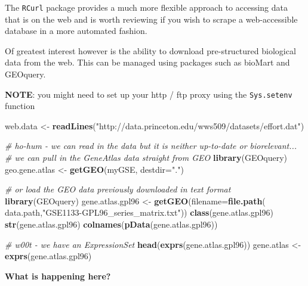 \documentclass[a4paper]{book}
\newenvironment{Shaded}{\begin{snugshade}}{\end{snugshade}}
\newcommand{\KeywordTok}[1]{\textcolor[rgb]{0.13,0.29,0.53}{\textbf{{#1}}}}
\newcommand{\DataTypeTok}[1]{\textcolor[rgb]{0.13,0.29,0.53}{{#1}}}
\newcommand{\StringTok}[1]{\textcolor[rgb]{0.31,0.60,0.02}{{#1}}}
\newcommand{\CommentTok}[1]{\textcolor[rgb]{0.56,0.35,0.01}{\textit{{#1}}}}
\newcommand{\NormalTok}[1]{{#1}}
\renewenvironment{Shaded}
{\vspace{1.5em}\begin{leftbar}\begin{snugshade}}
{\end{snugshade}\end{leftbar}\vspace{3pt}}
\begin{document}
The \texttt{RCurl} package provides a much more flexible approach to
accessing data that is on the web and is worth reviewing if you wish to
scrape a web-accessible database in a more automated fashion.

Of greatest interest however is the ability to download pre-structured
biological data from the web. This can be managed using packages such as
bioMart and GEOquery.

\textbf{NOTE}: you might need to set up your http / ftp proxy using the
\texttt{Sys.setenv} function

\begin{Shaded}
\begin{Highlighting}[]
\NormalTok{web.data <-}\StringTok{ }\KeywordTok{readLines}\NormalTok{(}\StringTok{"http://data.princeton.edu/wws509/datasets/effort.dat"}\NormalTok{)}

\CommentTok{# ho-hum - we can read in the data but it is neither up-to-date or biorelevant...}
\CommentTok{# we can pull in the GeneAtlas data straight from GEO}
\KeywordTok{library}\NormalTok{(GEOquery)}
\NormalTok{geo.gene.atlas <-}\StringTok{ }\KeywordTok{getGEO}\NormalTok{(myGSE, }\DataTypeTok{destdir=}\StringTok{"."}\NormalTok{)}

\CommentTok{# or load the GEO data previously downloaded in text format}
\KeywordTok{library}\NormalTok{(GEOquery)}
\NormalTok{gene.atlas.gpl96 <-}\StringTok{ }\KeywordTok{getGEO}\NormalTok{(}\DataTypeTok{filename=}\KeywordTok{file.path}\NormalTok{(}
\NormalTok{data.path,}\StringTok{"GSE1133-GPL96_series_matrix.txt"}\NormalTok{))}
\KeywordTok{class}\NormalTok{(gene.atlas.gpl96)}
\KeywordTok{str}\NormalTok{(gene.atlas.gpl96)}
\KeywordTok{colnames}\NormalTok{(}\KeywordTok{pData}\NormalTok{(gene.atlas.gpl96))}

\CommentTok{# w00t - we have an ExpressionSet}
\KeywordTok{head}\NormalTok{(}\KeywordTok{exprs}\NormalTok{(gene.atlas.gpl96))}
\NormalTok{gene.atlas <-}\StringTok{ }\KeywordTok{exprs}\NormalTok{(gene.atlas.gpl96)}
\end{Highlighting}
\end{Shaded}

\textbf{What is happening here?}
\end{document}
